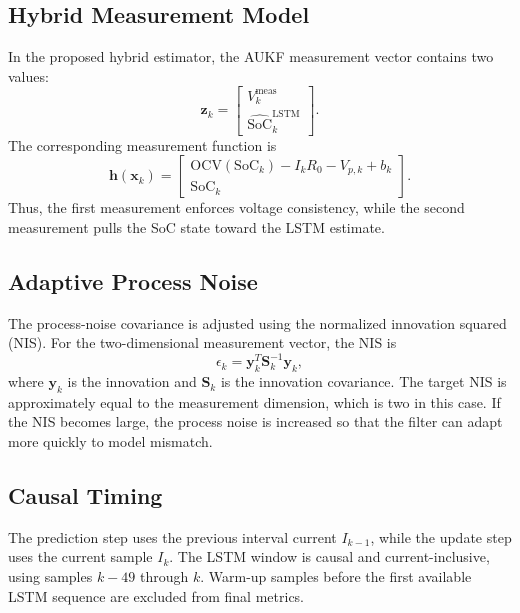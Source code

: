 \documentclass[lettersize,journal]{IEEEtran}
\begin{document}
\subsection{Hybrid Measurement Model}
In the proposed hybrid estimator, the AUKF measurement vector contains two values:
\begin{equation}
    \mathbf{z}_k =
    \begin{bmatrix}
    V^{\mathrm{meas}}_k \\
    \widehat{\mathrm{SoC}}^{\mathrm{LSTM}}_k
    \end{bmatrix}.
\end{equation}
The corresponding measurement function is
\begin{equation}
    \mathbf{h}(\mathbf{x}_k) =
    \begin{bmatrix}
    \mathrm{OCV}(\mathrm{SoC}_k) - I_kR_0 - V_{p,k} + b_k \\
    \mathrm{SoC}_k
    \end{bmatrix}.
    \label{eq:hybrid_hx}
\end{equation}
Thus, the first measurement enforces voltage consistency, while the second measurement pulls the SoC state toward the LSTM estimate.

\subsection{Adaptive Process Noise}
The process-noise covariance is adjusted using the normalized innovation squared (NIS). For the two-dimensional measurement vector, the NIS is
\begin{equation}
    \epsilon_k = \mathbf{y}_k^T \mathbf{S}_k^{-1}\mathbf{y}_k,
\end{equation}
where $\mathbf{y}_k$ is the innovation and $\mathbf{S}_k$ is the innovation covariance. The target NIS is approximately equal to the measurement dimension, which is two in this case. If the NIS becomes large, the process noise is increased so that the filter can adapt more quickly to model mismatch.

\subsection{Causal Timing}
The prediction step uses the previous interval current $I_{k-1}$, while the update step uses the current sample $I_k$. The LSTM window is causal and current-inclusive, using samples $k-49$ through $k$. Warm-up samples before the first available LSTM sequence are excluded from final metrics.
\end{document}
